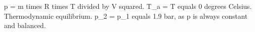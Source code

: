 p = m times R times T divided by V squared.  
T_a = T equals 0 degrees Celsius. Thermodynamic equilibrium.  
p_2 = p_1 equals 1.9 bar, as p is always constant and balanced.